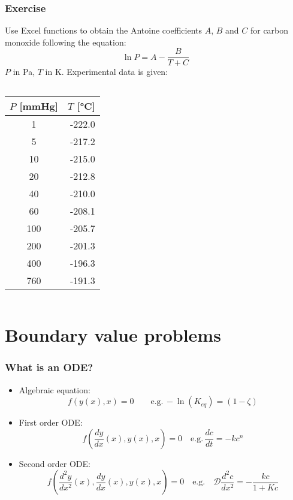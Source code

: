 \documentclass[11pt,table,final,fleqn,xcolor={usenames,dvipsnames,table}]{beamer}
\begin{document}
\begin{frame}
  \frametitle{Exercise}
  \footnotesize\selectfont
  Use Excel functions to obtain the Antoine coefficients $A$, $B$ and $C$ for carbon monoxide following the equation:
  \[
    \ln P = A - \frac{B}{T+C}
  \]
  $P$ in \si{\pascal}, $T$ in \si{\kelvin}. Experimental data is given:
  \begin{columns}
    \begin{longtable}{c|r}
      $P$ [\si{\mmHg}]& $T$ [\si{\celsius}] \\ \hline
      1	&-222.0\\
      5	&-217.2\\
      10	&-215.0\\
      20	&-212.8\\
      40	&-210.0\\
      60	&-208.1\\
      100	&-205.7\\
      200	&-201.3\\
      400	&-196.3\\
      760	&-191.3\\ \hline
    \end{longtable}
  \end{columns}
\end{frame}

\section{Boundary value problems}
\begin{frame}
  \frametitle{What is an ODE?}
  \begin{itemize}
    \item Algebraic equation:
    \[
      f(y(x),x) = 0 \qquad \text{e.g.} \, -\ln(K_{eq})=(1-\zeta)
    \]
    \item First order ODE:
    \[
      f\left(\frac{dy}{dx}(x),y(x),x\right) = 0 \quad \text{e.g.} \, \frac{dc}{dt} = -kc^n
    \]
    \item Second order ODE:
    \[
      f\left(\frac{d^2y}{dx^2}(x),\frac{dy}{dx}(x),y(x),x \right) = 0 \quad \text{e.g.} \quad \mathcal{D}\frac{d^2c}{dx^2}= - \frac{kc}{1+Kc}
    \]
  \end{itemize}
\end{frame}
\end{document}
